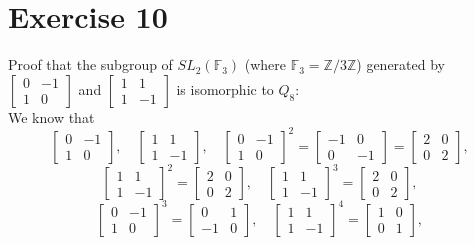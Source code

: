 \documentclass{article}
\newcommand{\Z}{\mathbb{Z}}
\newcommand{\F}{\mathbb{F}}
\begin{document}
    \section*{Exercise 10}
    Proof that the subgroup of $SL_2(\F_3)$
    (where $\F_3 = \Z/3\Z$)
    generated by $\begin{bmatrix} 0 & -1 \\ 1 & 0 \end{bmatrix}$
    and $\begin{bmatrix} 1 & 1 \\ 1 & -1 \end{bmatrix}$
    is isomorphic to $Q_8$: \\
    We know that 
    \[ \begin{bmatrix} 0 & -1 \\ 1 & 0 \end{bmatrix}, \quad
        \begin{bmatrix} 1 & 1 \\ 1 & -1 \end{bmatrix}, \quad
        \begin{bmatrix} 0 & -1 \\ 1 & 0 \end{bmatrix}^2
        = \begin{bmatrix} -1 & 0 \\ 0 & -1 \end{bmatrix}
        = \begin{bmatrix} 2 & 0 \\ 0 & 2 \end{bmatrix}, \] 
    \[ \begin{bmatrix} 1 & 1 \\ 1 & -1 \end{bmatrix}^2
    = \begin{bmatrix} 2 & 0 \\ 0 & 2 \end{bmatrix}, \quad
    \begin{bmatrix} 1 & 1 \\ 1 & -1 \end{bmatrix}^3
    = \begin{bmatrix} 2 & 0 \\ 0 & 2 \end{bmatrix}, \]
    \[ \begin{bmatrix} 0 & -1 \\ 1 & 0 \end{bmatrix}^3
    = \begin{bmatrix} 0 & 1 \\ -1 & 0 \end{bmatrix}, \quad
    \begin{bmatrix} 1 & 1 \\ 1 & -1 \end{bmatrix}^4
    = \begin{bmatrix} 1 & 0 \\ 0 & 1 \end{bmatrix}, \] 
\end{document}
